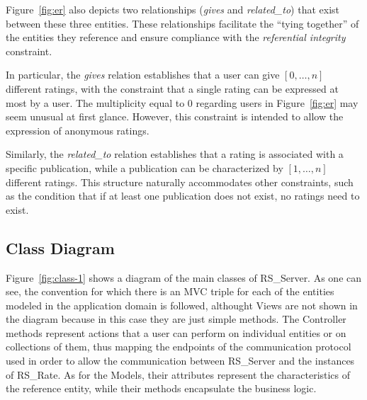 \documentclass[a4paper, english]{article}
\newcommand{\rsserver}{RS\_Server\xspace}
\newcommand{\rsrate}{RS\_Rate\xspace}
\begin{document}
Figure~\ref{fig:er} also depicts two relationships (\emph{gives} and \emph{related\_to}) that exist between these three entities. These relationships facilitate the ``tying together'' of the entities they reference and ensure compliance with the \emph{referential integrity} constraint.

In particular, the \emph{gives} relation establishes that a user can give $[0,\dots ,n]$ different ratings, with the constraint that a single rating can be expressed at most by a user. The multiplicity equal to $0$ regarding users in Figure~\ref{fig:er} may seem unusual at first glance. However, this constraint is intended to allow the expression of anonymous ratings.

Similarly, the \emph{related\_to} relation establishes that a rating is associated with a specific publication, while a publication can be characterized by $[1,\dots ,n]$ different ratings. This structure naturally accommodates other constraints, such as the condition that if at least one publication does not exist, no ratings need to exist.

\subsection{Class Diagram}

Figure~\ref{fig:class-1} shows a diagram of the main classes of \rsserver. As one can see, the convention for which there is an MVC triple for each of the entities modeled in the application domain is followed, althought Views are not shown in the diagram because in this case they are just simple methods. The Controller methods represent actions that a user can perform on individual entities or on collections of them, thus mapping the endpoints of the communication protocol used in order to allow the communication between \rsserver and the instances of \rsrate. As for the Models, their attributes represent the characteristics of the reference entity, while their methods encapsulate the business logic.
\end{document}
